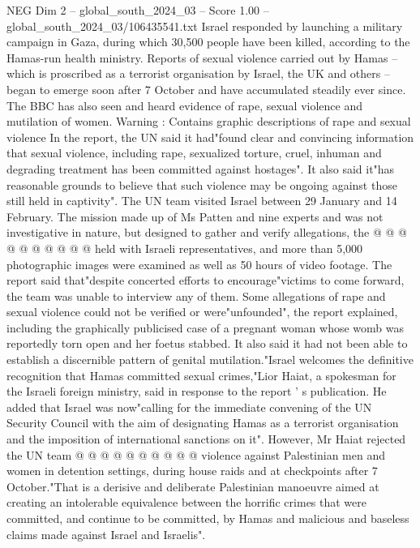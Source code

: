 \begin{textsample}{NEG Dim 2 – global\_south\_2024\_03 – Score 1.00 – global\_south\_2024\_03/106435541.txt}  \label{ex:f2_neg_438}
Israel responded by launching a military campaign in Gaza, during which 30,500 people have been killed, according to the Hamas-run health ministry.
Reports of sexual violence carried out by Hamas -- which is proscribed as a terrorist organisation by Israel, the UK and others -- began to emerge soon after 7 October and have accumulated steadily ever since.
The BBC has also seen and heard evidence of rape, sexual violence and mutilation of women.
Warning : Contains graphic descriptions of rape and sexual violence In the report, the UN said it had"found clear and convincing information that sexual violence, including rape, sexualized torture, cruel, inhuman and degrading treatment has been committed against hostages".
It also said it"has reasonable grounds to believe that such violence may be ongoing against those still held in captivity".
The UN team visited Israel between 29 January and 14 February.
The mission made up of Ms Patten and nine experts and was not investigative in nature, but designed to gather and verify allegations, the @ @ @ @ @ @ @ @ @ @ held with Israeli representatives, and more than 5,000 photographic images were examined as well as 50 hours of video footage.
The report said that"despite concerted efforts to encourage"victims to come forward, the team was unable to interview any of them.
Some allegations of rape and sexual violence could not be verified or were"unfounded", the report explained, including the graphically publicised case of a pregnant woman whose womb was reportedly torn open and her foetus stabbed.
It also said it had not been able to establish a discernible pattern of genital mutilation."Israel welcomes the definitive recognition that Hamas committed sexual crimes,"Lior Haiat, a spokesman for the Israeli foreign ministry, said in response to the report ' s publication.
He added that Israel was now"calling for the immediate convening of the UN Security Council with the aim of designating Hamas as a terrorist organisation and the imposition of international sanctions on it".
However, Mr Haiat rejected the UN team @ @ @ @ @ @ @ @ @ @ violence against Palestinian men and women in detention settings, during house raids and at checkpoints after 7 October."That is a derisive and deliberate Palestinian manoeuvre aimed at creating an intolerable equivalence between the horrific crimes that were committed, and continue to be committed, by Hamas and malicious and baseless claims made against Israel and Israelis".

\end{textsample}
